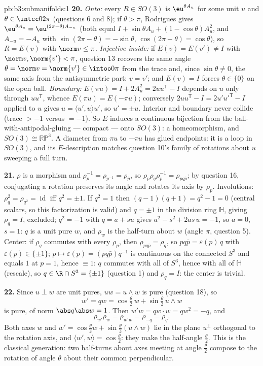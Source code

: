 \begin{solution}{pb:b3:submanifolds:1}
\textbf{20.} \emph{Onto:} every $R \in SO(3)$ is
$\eu^{\theta A_u}$ for some unit $u$ and $\theta \in
\intcc0{2\pi}$ (questions 6 and 8); if $\theta > \pi$,
Rodrigues gives $\eu^{\theta A_u} = \eu^{(2\pi -
\theta)A_{-u}}$ (both equal $I + \sin\theta A_u + (1 -
\cos\theta)A_u^2$, and $A_{-u} = -A_u$ with $\sin(2\pi -
\theta) = -\sin\theta$, $\cos(2\pi - \theta) =
\cos\theta$), so $R = E(v)$ with $\norm v \leq \pi$.
\emph{Injective inside:} if $E(v) = E(v') \neq I$ with
$\norm v, \norm{v'} < \pi$, question 13 recovers the same
angle $\theta = \norm v = \norm{v'} \in \intoo0\pi$ from
the trace and, since $\sin\theta \neq 0$, the same axis
from the antisymmetric part: $v = v'$; and $E(v) = I$
forces $\theta \in \{0\}$ on the open ball. \emph{Boundary:}
$E(\pi u) = I + 2A_u^2 = 2uu^{\mathsf T} - I$ depends on
$u$ only through $uu^{\mathsf T}$, whence $E(\pi u) =
E(-\pi u)$; conversely $2uu^{\mathsf T} - I =
2u'u'^{\mathsf T} - I$ applied to $u$ gives $u = \langle
u', u\rangle u'$, so $u' = \pm u$. Interior and boundary
never collide (trace $> -1$ versus $= -1$). So $E$ induces
a continuous bijection from the ball-with-antipodal-gluing
--- compact --- onto $SO(3)$: a homeomorphism, and $SO(3)
\cong \mathbb{RP}^3$. A diameter from $\pi u$ to $-\pi u$
has glued endpoints: it is a loop in $SO(3)$, and its
$E$-description matches question 10's family of rotations
about $u$ sweeping a full turn.

\textbf{21.} $\rho$ is a morphism and $\rho_p^{-1} =
\rho_{p^{-1}} = \rho_{\bar p}$, so $\rho_p\rho_q\rho_p^{-1}
= \rho_{pq\bar p}$; by question 16, conjugating a rotation
preserves its angle and rotates its axis by $\rho_p$.
Involutions: $\rho_q^2 = \rho_{q^2} = \operatorname{id}$
iff $q^2 = \pm1$. If $q^2 = 1$ then $(q - 1)(q + 1) = q^2 -
1 = 0$ (central scalars, so this factorization is valid) and
$q = \pm1$ in the division ring $\mathbb H$, giving $\rho_q
= I$, excluded; $q^2 = -1$ with $q = a +
su$ gives $a^2 - s^2 + 2as\,u = -1$, so $a = 0$, $s = 1$:
$q$ is a unit pure $w$, and $\rho_w$ is the half-turn about
$w$ (angle $\pi$, question 5). Center: if $\rho_q$ commutes
with every $\rho_p$, then $\rho_{pq\bar p} = \rho_q$, so
$pq\bar p = \varepsilon(p)\,q$ with $\varepsilon(p) \in
\{\pm1\}$; $p \mapsto \varepsilon(p) = (pq\bar p)q^{-1}$ is
continuous on the connected $S^3$ and equals $1$ at $p =
1$, hence $\equiv 1$: $q$ commutes with all of $S^3$, hence
with all of $\mathbb H$ (rescale), so $q \in \R \cap S^3 =
\{\pm1\}$ (question 1) and $\rho_q = I$: the center is
trivial.

\textbf{22.} Since $u \perp w$ are unit pures, $uw =
u\wedge w$ is pure (question 18), so
\[
w' = qw = \cos\tfrac\theta2\,w + \sin\tfrac\theta2\,u\wedge
w
\]
is pure, of norm $\abs q\abs w = 1$. Then $w'w = qw\cdot w
= qw^2 = -q$, and
\[
\rho_{w'}\rho_w = \rho_{w'w} = \rho_{-q} = \rho_q .
\]
Both axes $w$ and $w' = \cos\frac\theta2 w +
\sin\frac\theta2(u\wedge w)$ lie in the plane $u^\perp$
orthogonal to the rotation axis, and $\langle w', w\rangle
= \cos\frac\theta2$: they make the half-angle
$\frac\theta2$. This is the classical generation: two
half-turns about axes meeting at angle $\frac\theta2$
compose to the rotation of angle $\theta$ about their
common perpendicular.


\end{solution}
